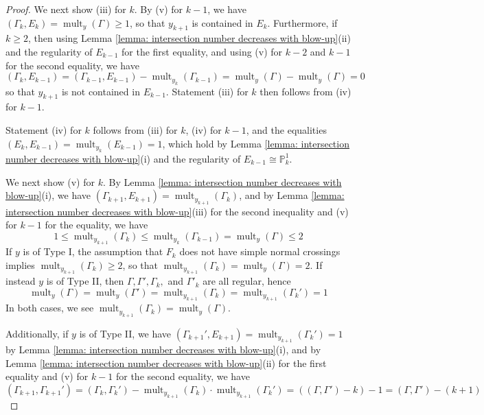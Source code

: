 \documentclass[12pt]{amsart}
\numberwithin{equation}{section}
\theoremstyle{definition}
\renewcommand{\P}{\mathbb P}
\newcommand{\Y}{\mathcal{Y}}
\DeclareMathOperator{\mult}{mult}
\begin{document}
\begin{proof}
    We next show (iii) for $k$. By (v) for $k-1$, we have $(\Gamma_k,E_k)=\mult_y(\Gamma)\geq 1$, so that $y_{k+1}$ is contained in $E_k$. Furthermore, if $k\geq 2$, then using Lemma \ref{lemma: intersection number decreases with blow-up}(ii) and the regularity of $E_{k-1}$ for the first equality, and using (v) for $k-2$ and $k-1$ for the second equality, we have \[(\Gamma_k, E_{k-1})=(\Gamma_{k-1},E_{k-1})-\mult_{y_k}(\Gamma_{k-1})=\mult_y(\Gamma)-\mult_y(\Gamma)=0\] so that $y_{k+1}$ is not contained in $E_{k-1}$. Statement (iii) for $k$ then follows from (iv) for $k-1$.
    
    Statement (iv) for $k$ follows from (iii) for $k$, (iv) for $k-1$, and the equalities $(E_k,E_{k-1})=\mult_{y_k}(E_{k-1})=1$, which hold by Lemma \ref{lemma: intersection number decreases with blow-up}(i) and the regularity of $E_{k-1}\cong\P^1_k$.


    We next show (v) for $k$. By Lemma \ref{lemma: intersection number decreases with blow-up}(i), we have $(\Gamma_{k+1},E_{k+1})=\mult_{y_{k+1}}(\Gamma_k)$, and by Lemma \ref{lemma: intersection number decreases with blow-up}(iii) for the second inequality and (v) for $k-1$ for the equality, we have \[1\leq\mult_{y_{k+1}}(\Gamma_k)\leq\mult_{y_k}(\Gamma_{k-1})=\mult_y(\Gamma)\leq 2\]
    If $y$ is of Type I, the assumption that $F_k$ does not have simple normal crossings implies $\mult_{y_{k+1}}(\Gamma_k)\geq2$, so that $\mult_{y_{k+1}}(\Gamma_k)=\mult_y(\Gamma)=2$. If instead $y$ is of Type II, then $\Gamma,\Gamma',\Gamma_k,$ and $\Gamma'_k$ are all regular, hence \[\mult_y(\Gamma)=\mult_y(\Gamma')=\mult_{y_{k+1}}(\Gamma_k)=\mult_{y_{k+1}}(\Gamma_k')=1\] In both cases, we see $\mult_{y_{k+1}}(\Gamma_k)=\mult_y(\Gamma)$.
    
    Additionally, if $y$ is of Type II, we have $(\Gamma_{k+1}',E_{k+1})=\mult_{y_{k+1}}(\Gamma_k')=1$ by Lemma \ref{lemma: intersection number decreases with blow-up}(i), and by Lemma \ref{lemma: intersection number decreases with blow-up}(ii) for the first equality and (v) for $k-1$ for the second equality, we have
    \[(\Gamma_{k+1},\Gamma_{k+1}')=(\Gamma_k,\Gamma_k')-\mult_{y_{k+1}}(\Gamma_k)\cdot\mult_{y_{k+1}}(\Gamma_k')=((\Gamma,\Gamma')-k)-1=(\Gamma,\Gamma')-(k+1)\]


\end{proof}
\end{document}
